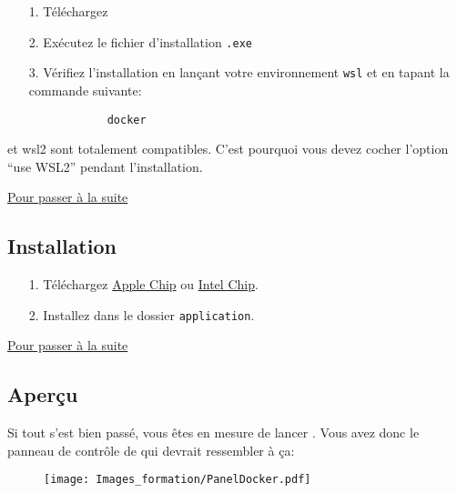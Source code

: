     \begin{itemize}
        \item[1.] Téléchargez \href{https://desktop.docker.com/win/main/amd64/Docker%20Desktop%20Installer.exe}{\dockerdesktop{}}
        
        \item[2.] Exécutez le fichier d'installation \verb|.exe|
        
        \item[3.] Vérifiez l'installation en lançant votre environnement \verb|wsl| et en tapant la commande suivante:
        \begin{lstlisting}
            docker
        \end{lstlisting}
    \end{itemize}

    \docker{} et wsl2 sont totalement compatibles. C'est pourquoi vous devez cocher l'option ``use WSL2'' pendant l'installation. 

    \hyperref[sec:suite_installation]{Pour passer à la suite}

\newpage
\subsection[Installation MacOS]{Installation \macos{}\label{sec:installation_macos}}

    \begin{itemize}
        \item[1.] Téléchargez \dockerdesktop{} \href{https://desktop.docker.com/mac/main/arm64/Docker.dmg?utm_source=docker&utm_medium=webreferral&utm_campaign=dd-smartbutton&utm_location=module}{Apple Chip} ou \href{https://desktop.docker.com/mac/main/amd64/Docker.dmg?utm_source=docker&utm_medium=webreferral&utm_campaign=dd-smartbutton&utm_location=module}{Intel Chip}.
        \item[2.] Installez \dockerdesktop{} dans le dossier \verb|application|.
    \end{itemize}

    \hyperref[sec:suite_installation]{Pour passer à la suite}

\newpage

\subsection[Aperçu]{Aperçu\label{sec:suite_installation}}
    Si tout s'est bien passé, vous êtes en mesure de lancer \dockerdesktop{}. Vous avez donc le panneau de contrôle de \dockerdesktop{} qui devrait ressembler à ça:\\
    \begin{figure}[h]
        \centering
        \texttt{[image: Images\_formation/PanelDocker.pdf]}
    \end{figure}

